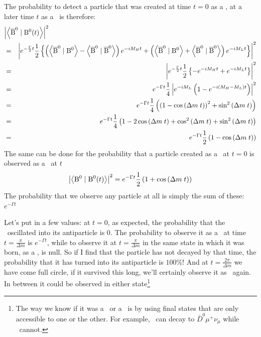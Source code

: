  The probability to detect a particle that was created at time $t=0$ as a \Bo, at a later time $t$ as a \Bob\, is therefore:
 \begin{eqnarray}
%
\lefteqn{\left|\braket{\Bob}{\Bo(t)}\right|^2} \nonumber\\
&=& \left|
\expthalf \frac{1}{2} 
     \left\{ \left( \braket{\Bob}{\Bo}-\braket{\Bob}{\Bob} \right) \expmh
           + \left( \braket{\Bob}{\Bo}+\braket{\Bob}{\Bob} \right) \expml \right\}\right|^2
\nonumber\\
&=& \left|
\expthalf \frac{1}{2} 
     \left\{- \expmh
            + \expml \right\}\right|^2
\nonumber\\
&=&
e^{-\Gamma t} \frac{1}{4} 
     \left| e^{-i M_L} \left(1
               -  e^{-i(M_H - M_L)t}\right)\right|^2
\nonumber\\
&=&
e^{-\Gamma t} \frac{1}{4} \left(
     \left(1 - \cos\left(\Delta m\;t\right)\right)^2 + \sin^2\left(\Delta m\;t\right) 
     \right)
\nonumber\\
&=&
e^{-\Gamma t} \frac{1}{4} \left(
     1 - 2 \cos\left(\Delta m\;t\right) + \cos^2\left(\Delta m\;t\right) + \sin^2\left(\Delta m\;t\right) 
     \right)
\nonumber\\
&=&
e^{-\Gamma t} \frac{1}{2} \left(
     1 - \cos\left(\Delta m\;t\right) \right)
\end{eqnarray}
The same can be done for the probability that a particle created as a \Bo\ at $t=0$ is observed as a \Bo\ at $t$
\begin{equation}
\left| \left< {\rm B^0}\; |\; {\rm B^0}(t) \right>\right|^2 = e^{-\Gamma t} \frac{1}{2} \left(
     1 + \cos\left(\Delta m\;t\right) \right)
\end{equation}
The probability that we observe any particle at all is simply the sum of these: $e^{-\Gamma t}$

Let's put in a few values: at $t=0$, as expected, the probability that the \Bo\ oscillated into its antiparticle is $0$. The probability to observe it as a \Bob\ at time $t = \frac{\pi}{\Delta m}$ is $e^{-\Gamma t}$, while to observe it at $t = \frac{\pi}{\Delta m}$ in the same state in which it was born, as a \Bo, is null. So if I find that the particle has not decayed by that time, the probability that it has turned into its antiparticle is $100\%$! And at $t = \frac{2\pi}{\Delta m}$ we have come full circle, if it survived this long, we'll certainly observe it as \Bo\ again. In between it could be observed in either state\footnote{The way we know if it was a \Bo\ or a \Bob\ is by using final states that are only accessible to one or the other. For example, \Bo\ can decay to $\bar{D}^0 \mu^+ \nu_{\mu}$ while \Bob\ cannot.}

